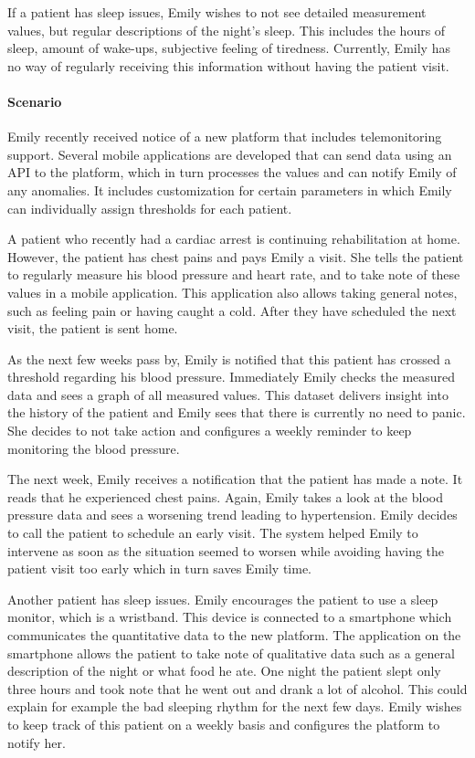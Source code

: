         If a patient has sleep issues, Emily wishes to not see detailed measurement values, but regular descriptions of the night’s sleep. This includes the hours of sleep, amount of wake-ups, subjective feeling of tiredness. Currently, Emily has no way of regularly receiving this information without having the patient visit.
        
        \paragraph{Scenario} Emily recently received notice of a new platform that includes telemonitoring support. Several mobile applications are developed that can send data using an API to the platform, which in turn processes the values and can notify Emily of any anomalies. It includes customization for certain parameters in which Emily can individually assign thresholds for each patient.

        A patient who recently had a cardiac arrest is continuing rehabilitation at home. However, the patient has chest pains and pays Emily a visit. She tells the patient to regularly measure his blood pressure and heart rate, and to take note of these values in a mobile application. This application also allows taking general notes, such as feeling pain or having caught a cold. After they have scheduled the next visit, the patient is sent home.
        
        As the next few weeks pass by, Emily is notified that this patient has crossed a threshold regarding his blood pressure. Immediately Emily checks the measured data and sees a graph of all measured values. This dataset delivers insight into the history of the patient and Emily sees that there is currently no need to panic. She decides to not take action and configures a weekly reminder to keep monitoring the blood pressure.
        
        The next week, Emily receives a notification that the patient has made a note. It reads that he experienced chest pains. Again, Emily takes a look at the blood pressure data and sees a worsening trend leading to hypertension. Emily decides to call the patient to schedule an early visit. The system helped Emily to intervene as soon as the situation seemed to worsen while avoiding having the patient visit too early which in turn saves Emily time.
        
        Another patient has sleep issues. Emily encourages the patient to use a sleep monitor, which is a wristband. This device is connected to a smartphone which communicates the quantitative data to the new platform. The application on the smartphone allows the patient to take note of qualitative data such as a general description of the night or what food he ate. One night the patient slept only three hours and took note that he went out and drank a lot of alcohol. This could explain for example the bad sleeping rhythm for the next few days. Emily wishes to keep track of this patient on a weekly basis and configures the platform to notify her.\bigskip

